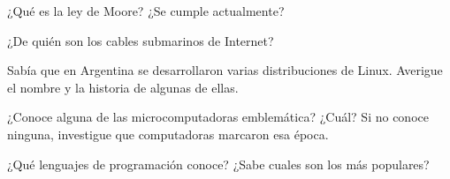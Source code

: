 \begin{exercise}
¿Qué es la ley de Moore? ¿Se cumple actualmente?
\end{exercise}

\begin{exercise}
¿De quién son los cables submarinos de Internet?
\end{exercise}

\begin{exercise}
Sabía que en Argentina se desarrollaron varias distribuciones de Linux. Averigue
el nombre y la historia de algunas de ellas.
\end{exercise}

\begin{exercise}
¿Conoce alguna de las microcomputadoras emblemática? ¿Cuál? Si no conoce ninguna,
investigue que computadoras marcaron esa época.
\end{exercise}

\begin{exercise}
¿Qué lenguajes de programación conoce?
¿Sabe cuales son los más populares?
\end{exercise}










